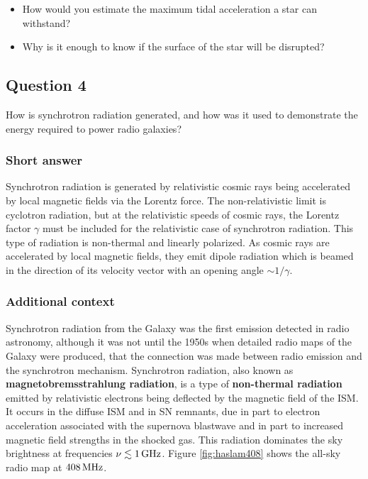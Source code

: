 \documentclass[a4paper,10pt]{article}
\begin{document}
\begin{itemize}
    \item How would you estimate the maximum tidal acceleration a star can withstand?
    \item Why is it enough to know if the surface of the star will be disrupted?
\end{itemize}


\newpage
\subsection{Question 4}

How is synchrotron radiation generated, and how was it used to demonstrate the energy required to power radio galaxies?

\subsubsection{Short answer}

Synchrotron radiation is generated by relativistic cosmic rays being accelerated by local magnetic fields via the Lorentz force. The non-relativistic limit is cyclotron radiation, but at the relativistic speeds of cosmic rays, the Lorentz factor $\gamma$ must be included for the relativistic case of synchrotron radiation. This type of radiation is non-thermal and linearly polarized. As cosmic rays are accelerated by local magnetic fields, they emit dipole radiation which is beamed in the direction of its velocity vector with an opening angle $\sim1/\gamma$.

\subsubsection{Additional context}

Synchrotron radiation from the Galaxy was the first emission detected in radio astronomy, although it was not until the 1950s when detailed radio maps of the Galaxy were produced, that the connection was made between radio emission and the synchrotron mechanism. Synchrotron radiation, also known as \textbf{magnetobremsstrahlung radiation}, is a type of \textbf{non-thermal radiation} emitted by relativistic electrons being deflected by the magnetic field of the ISM. It occurs in the diffuse ISM and in SN remnants, due in part to electron acceleration associated with the supernova blastwave and in part to increased magnetic field strengths in the shocked gas. This radiation dominates the sky brightness at frequencies $\nu\lesssim1\,{\rm GHz}$. Figure \ref{fig:haslam408} shows the all-sky radio map at $408\,{\rm MHz}$.
\end{document}

